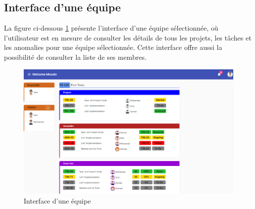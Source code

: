 \subsection{	Interface d’une équipe}
\hspace{4mm}La figure ci-dessous \ref{fig:interface_équipe} présente l’interface d’une équipe sélectionnée, où l’utilisateur est en mesure de consulter les détails de tous les projets, les tâches et les anomalies pour une équipe sélectionnée. Cette interface offre aussi la possibilité de consulter la liste de ses membres.\newline
\begin{figure}[h]
    \centering
    \includegraphics{figures/33anis19.png}
    \caption{Interface d’une équipe}
    \label{fig:interface_équipe}
\end{figure}\newpage
